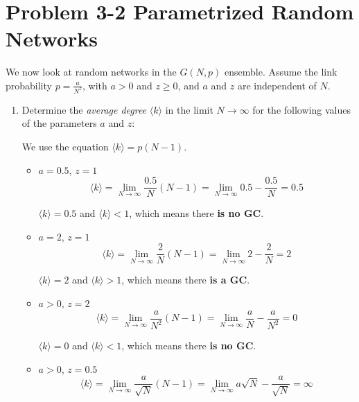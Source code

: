 \section{Problem 3-2 Parametrized Random Networks}

We now look at random networks in the $G(N,p)$ ensemble. Assume the link probability $p = \frac{a}{N^z}$, with $a > 0$ and $z \geq 0$, and $a$ and $z$ are independent of $N$.

\begin{enumerate}
	\item Determine the \textit{average degree} $\langle k \rangle$ in the limit $N \rightarrow \infty$ for the following values of the parameters $a$ and $z$:

	We use the equation $\langle k \rangle = p(N-1)$.
	
	\begin{itemize}
		\item $a=0.5$,  $z=1$
			\begin{equation}
				\langle k \rangle = \lim\limits_{N \rightarrow \infty} \frac{0.5}{N}(N-1) =\lim\limits_{N \rightarrow \infty} 0.5 - \frac{0.5}{N} = 0.5
			\end{equation}
			
			$\langle k \rangle = 0.5$ and $\langle k \rangle < 1$, which means there \textbf{is no GC}. 
		\item $a=2$,  $z=1$
			\begin{equation}
				\langle k \rangle = \lim\limits_{N \rightarrow \infty} \frac{2}{N}(N-1) =\lim\limits_{N \rightarrow \infty} 2 - \frac{2}{N} = 2
			\end{equation}
			
			$\langle k \rangle = 2$ and $\langle k \rangle > 1$, which means there \textbf{is a GC}. 
		\item $a>0$,  $z=2$
			\begin{equation}
				\langle k \rangle = \lim\limits_{N \rightarrow \infty} \frac{a}{N^2}(N-1) =\lim\limits_{N \rightarrow \infty} \frac{a}{N} - \frac{a}{N^2} = 0
			\end{equation}
			
			$\langle k \rangle = 0$ and $\langle k \rangle < 1$, which means there \textbf{is no GC}. 
		\item $a>0$,  $z=0.5$
			\begin{equation}
				\langle k \rangle = \lim\limits_{N \rightarrow \infty} \frac{a}{\sqrt{N}}(N-1) =\lim\limits_{N \rightarrow \infty} a\sqrt{N} - \frac{a}{\sqrt{N}} = \infty
			\end{equation}
			

\end{itemize}
\end{enumerate}
